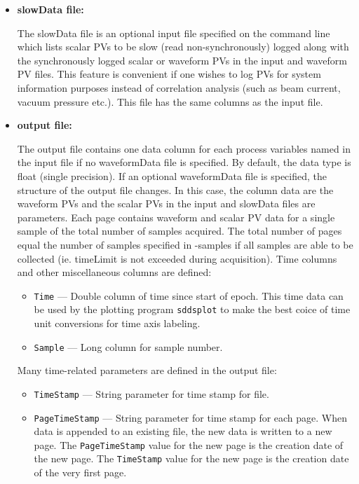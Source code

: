 \begin{itemize}
\begin{itemize}
\item {\bf slowData file:} \par The slowData file is an optional input
file specified on the command line which lists scalar PVs to be slow
(read non-synchronously) logged along with the synchronously logged
scalar or waveform PVs in the input and waveform PV files.  This feature is
convenient if one wishes to log PVs for system information purposes instead of
correlation analysis (such as beam current, vacuum pressure etc.).  This file has
the same columns as the input file.

\item {\bf output file:}\par The output file contains one data column
for each process variables named in the input file if no waveformData
file is specified. By default, the data type is float (single
precision).  If an optional waveformData file is specified, the
structure of the output file changes.  In this case, the column data
are the waveform PVs and the scalar PVs in the input and slowData
files are parameters.  Each page contains waveform and scalar PV data
for a single sample of the total number of samples acquired.  The
total number of pages equal the number of samples specified in
-samples if all samples are able to be collected (ie. timeLimit is not
exceeded during acquisition).  Time columns and other miscellaneous
columns are defined:
\begin{itemize}
        \item {\tt Time} --- Double column of time since start of epoch. This time data can be used by
        the plotting program {\verb+sddsplot+} to make the best coice of time unit conversions
        for time axis labeling.
        \item {\tt Sample} --- Long column for sample number.
\end{itemize}
Many time-related parameters are defined in the output file:
\begin{itemize}
        \item {\tt TimeStamp} --- String parameter for time stamp for file.
        \item {\tt PageTimeStamp} --- String parameter for time stamp for each page. When data
                is appended to an existing file, the new data is written to a new
                page. The {\tt PageTimeStamp} value for the new page is the creation
                date of the new page. The {\tt TimeStamp} value for the new page is the creation 
                date of the very first page.

\end{itemize}
\end{itemize}
\end{itemize}

